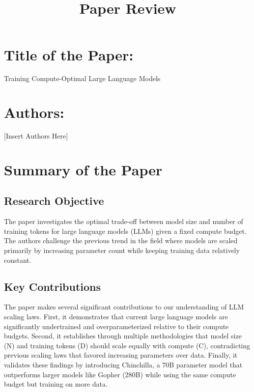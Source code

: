 \documentclass{article}
\title{\textbf{Paper Review}}
\author{}
\date{}
\begin{document}
\maketitle

\section*{Title of the Paper:}
Training Compute-Optimal Large Language Models

\section*{Authors:}
[Insert Authors Here]
\section{Summary of the Paper}

\subsection{Research Objective}
The paper investigates the optimal trade-off between model size and number of training tokens for large language models (LLMs) given a fixed compute budget. The authors challenge the previous trend in the field where models are scaled primarily by increasing parameter count while keeping training data relatively constant.

\subsection{Key Contributions}
The paper makes several significant contributions to our understanding of LLM scaling laws. First, it demonstrates that current large language models are significantly undertrained and overparameterized relative to their compute budgets. Second, it establishes through multiple methodologies that model size (N) and training tokens (D) should scale equally with compute (C), contradicting previous scaling laws that favored increasing parameters over data. Finally, it validates these findings by introducing Chinchilla, a 70B parameter model that outperforms larger models like Gopher (280B) while using the same compute budget but training on more data.
\end{document}
